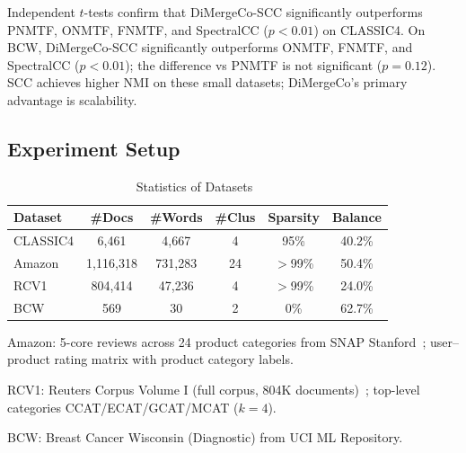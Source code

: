 \documentclass[journal]{IEEEtran}
\theoremstyle{definition}
\theoremstyle{remark} %
\renewcommand{\cite}[1]{~\autocite{#1}}
\begin{document}
{\begin{table}[htbp]
\begin{threeparttable}
\begin{tablenotes}
            \item[$\dagger$] Independent $t$-tests confirm that DiMergeCo-SCC significantly outperforms PNMTF, ONMTF, FNMTF, and SpectralCC ($p < 0.01$) on CLASSIC4. On BCW, DiMergeCo-SCC significantly outperforms ONMTF, FNMTF, and SpectralCC ($p < 0.01$); the difference vs PNMTF is not significant ($p = 0.12$). SCC achieves higher NMI on these small datasets; DiMergeCo's primary advantage is scalability.
        \end{tablenotes}
    \end{threeparttable}
\end{table}
}


\subsection{Experiment Setup}

\begin{table}[ht]
    \centering
    \caption{Statistics of Datasets\cite{role2019CoClustPythonPackage}}
    \label{tab:dataset-statistics}
    \begin{threeparttable}
        \begin{tabular}{l||c|c|c|c|c}
            \hline
            \textbf{Dataset} & \textbf{\#Docs} & \textbf{\#Words}   & \textbf{\#Clus} & \textbf{Sparsity} & \textbf{Balance} \\
            \hline
            CLASSIC4         & 6,461           & 4,667              & 4               & 95\%              & 40.2\%           \\
            Amazon           & 1,116,318       & 731,283            & 24              & $>$99\%           & 50.4\%           \\
            RCV1             & 804,414         & 47,236             & 4               & $>$99\%           & 24.0\%           \\
            BCW              & 569             & 30                 & 2               & 0\%               & 62.7\%           \\
            \hline
        \end{tabular}
        \begin{tablenotes}
            \small
            \item Amazon: 5-core reviews across 24 product categories from SNAP Stanford\cite{ni2019JustifyingRecommendationsUsing}; user--product rating matrix with product category labels.
            \item RCV1: Reuters Corpus Volume I (full corpus, 804K documents)\cite{lewis2004RCV1NewBenchmark}; top-level categories CCAT/ECAT/GCAT/MCAT ($k{=}4$).
            \item BCW: Breast Cancer Wisconsin (Diagnostic) from UCI ML Repository.
        \end{tablenotes}
    \end{threeparttable}
\end{table}
\end{document}
